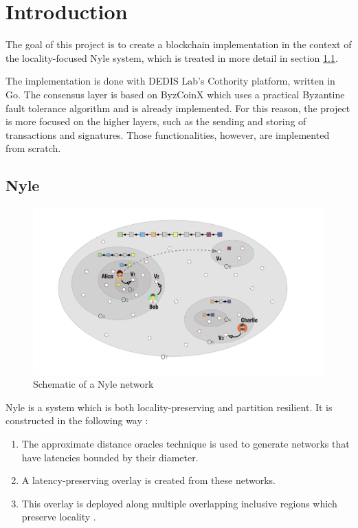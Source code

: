 \documentclass[11pt, a4paper, twoside, openright]{article}
\begin{document}


\newpage
\setcounter{page}{1}
\tableofcontents
\newpage
        

\section{Introduction}
The goal of this project is to create a blockchain implementation in the context of the locality-focused Nyle system, which is treated in more detail in section \ref{Nyle}.

The implementation is done with DEDIS Lab's Cothority platform, written in Go. The consensus layer is based on ByzCoinX \cite{byzcoinx} which uses a practical Byzantine fault tolerance algorithm \cite{castro1999practical} and is already implemented. For this reason, the project is more focused on the higher layers, such as the sending and storing of transactions and signatures. Those functionalities, however, are implemented from scratch. 

\subsection{Nyle}
\label{Nyle}

\begin{figure}[htbp]
 \centering
  \includegraphics[width=12cm]{nyle.png}
  \caption{Schematic of a Nyle network}
\end{figure}

Nyle is a system which is both locality-preserving and partition resilient. It is constructed in the following way :

\begin{enumerate} 

\itemsep0em

 \item The approximate distance oracles technique \cite{thorup2005approximate} is used to generate networks that have latencies bounded by their diameter.
 \item A latency-preserving overlay is created from these networks.
 \item This overlay is deployed along multiple overlapping inclusive regions which preserve locality \cite{basescu2014crux}.

\end{enumerate}
\end{document}
